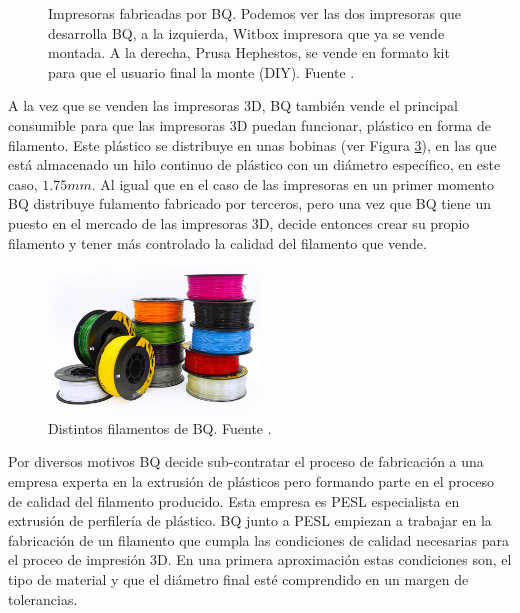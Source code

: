 \begin{figure}[!h]
\begin{subfigure}[b]{0.3\textwidth}
        \label{fig:estado_hephestos}
    \end{subfigure}
    \caption[Impresoras fabricadas por BQ.]{Impresoras fabricadas por BQ. Podemos ver las dos impresoras que desarrolla BQ, a la izquierda, Witbox impresora que ya se vende montada. A la derecha, Prusa Hephestos, se vende en formato kit para que el usuario final la monte (DIY). Fuente \cite{bq}.}
    \label{fig:impresoras_bq}
\end{figure}

A la vez que se venden las impresoras 3D, BQ también vende el principal consumible para que las impresoras 3D puedan funcionar, plástico en forma de filamento. Este plástico se distribuye en unas bobinas (ver Figura \ref{fig:estado_filamento}), en las que está almacenado un hilo continuo de plástico con un diámetro específico, en este caso, $1.75mm$. Al igual que en el caso de las impresoras en un primer momento BQ distribuye fulamento fabricado por terceros, pero una vez que BQ tiene un puesto en el mercado de las impresoras 3D, decide entonces crear su propio filamento y tener más controlado la calidad del filamento que vende.

\begin{figure}[!ht]
    \centering
    \includegraphics[width=0.5\textwidth]{images/filamento_bq.png}
    \caption[Distintos filamentos de BQ.]{Distintos filamentos de BQ. Fuente \cite{bq}.}
    \label{fig:estado_filamento}
\end{figure}

Por diversos motivos BQ decide sub-contratar el proceso de fabricación a una empresa experta en la extrusión de plásticos pero formando parte en el proceso de calidad del filamento producido. Esta empresa es PESL especialista en extrusión de perfilería de plástico. BQ junto a PESL empiezan a trabajar en la fabricación de un filamento que cumpla las condiciones de calidad necesarias para el proceo de impresión 3D. En una primera aproximación estas condiciones son, el tipo de material y que el diámetro final esté comprendido en un margen de tolerancias.\\

